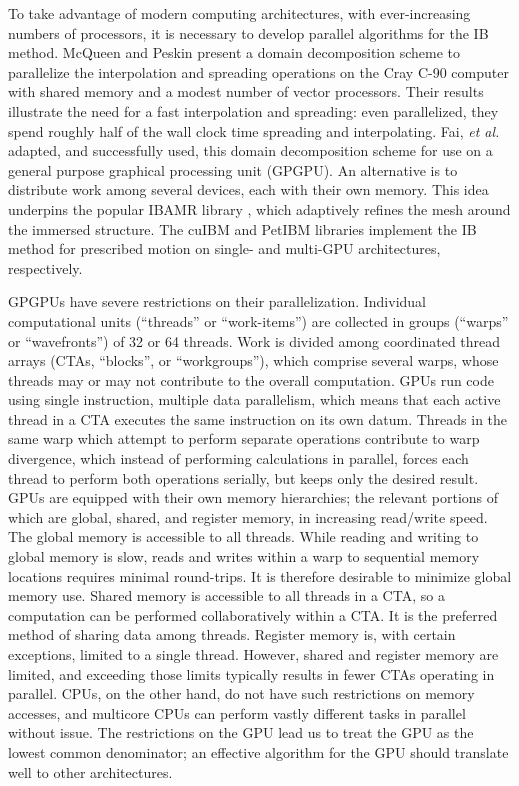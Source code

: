 To take advantage of modern computing architectures, with ever-increasing numbers of
processors, it is necessary to develop parallel algorithms for the IB method.
McQueen and Peskin \cite{McQueen:1997kw} present a domain decomposition scheme to
parallelize the interpolation and spreading operations on the Cray C-90 computer with
shared memory and a modest number of vector processors. Their results illustrate the need
for a fast interpolation and spreading: even parallelized, they spend roughly half of the
wall clock time spreading and interpolating. Fai, \textit{et al.} \cite{Fai:2013do}
adapted, and successfully used, this domain decomposition scheme for use on a general
purpose graphical processing unit (GPGPU).  An alternative is to distribute work among
several devices, each with their own memory. This idea underpins the popular IBAMR
library \cite{Griffith:2007uk}, which adaptively refines the mesh around the immersed
structure. The cuIBM \cite{Layton:2011um} and PetIBM \cite{Chuang:2018ej} libraries
implement the IB method for prescribed motion on single- and multi-GPU architectures,
respectively.

GPGPUs have severe restrictions on their parallelization. Individual computational units
(``threads'' or ``work-items'') are collected in groups (``warps'' or ``wavefronts'') of
32 or 64 threads. Work is divided among coordinated thread arrays (CTAs, ``blocks'', or
``workgroups''), which comprise several warps, whose threads may or may not contribute to
the overall computation. GPUs run code using single instruction, multiple data
parallelism, which means that each active thread in a CTA executes the same instruction
on its own datum. Threads in the same warp which attempt to perform separate operations
contribute to warp divergence, which instead of performing calculations in parallel,
forces each thread to perform both operations serially, but keeps only the desired
result. GPUs are equipped with their own memory hierarchies; the relevant portions of
which are global, shared, and register memory, in increasing read/write speed. The global
memory is accessible to all threads. While reading and writing to global memory is slow,
reads and writes within a warp to sequential memory locations requires minimal
round-trips. It is therefore desirable to minimize global memory use. Shared memory is
accessible to all threads in a CTA, so a computation can be performed collaboratively
within a CTA. It is the preferred method of sharing data among threads. Register memory
is, with certain exceptions, limited to a single thread.  However, shared and register
memory are limited, and exceeding those limits typically results in fewer CTAs operating
in parallel. CPUs, on the other hand, do not have such restrictions on memory accesses,
and multicore CPUs can perform vastly different tasks in parallel without issue. The
restrictions on the GPU lead us to treat the GPU as the lowest common denominator; an
effective algorithm for the GPU should translate well to other architectures.


